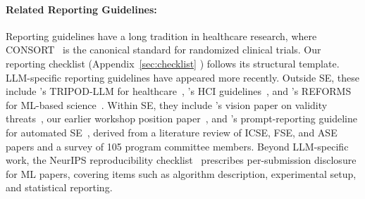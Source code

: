 \documentclass[smallextended]{svjour3}
\newif\ifpaper\papertrue
\newcommand{\scopeparagraph}[1]{\paragraph{\bfseries #1:}}
\newcommand{\scopeparagraph}[1]{\subsubsection{#1}}
\begin{document}
\scopeparagraph{Related Reporting Guidelines}

Reporting guidelines have a long tradition in healthcare research, where CONSORT~\cite{Schulz2010} is the canonical standard for randomized clinical trials. Our reporting checklist (\ifpaper Appendix~\ref{sec:checklist} \else \href{/checklist/}{checklist} \fi) follows its structural template. LLM-specific reporting guidelines have appeared more recently. Outside SE, these include \citeauthor{Gallifant2025}'s TRIPOD-LLM for healthcare~\cite{Gallifant2025}, \citeauthor{DBLP:conf/chi/NavarroSA26}'s HCI guidelines~\cite{DBLP:conf/chi/NavarroSA26}, and \citeauthor{Kapoor2024REFORMS}'s REFORMS for ML-based science~\cite{Kapoor2024REFORMS}. Within SE, they include \citeauthor{DBLP:conf/icse/SallouDP24}'s vision paper on validity threats~\cite{DBLP:conf/icse/SallouDP24}, our earlier workshop position paper~\cite{DBLP:conf/wsese/0001BFB25}, and \citeauthor{DBLP:journals/corr/abs-2601-01954}'s prompt-reporting guideline for automated SE~\cite{DBLP:journals/corr/abs-2601-01954}, derived from a literature review of ICSE, FSE, and ASE papers and a survey of 105 program committee members. Beyond LLM-specific work, the NeurIPS reproducibility checklist~\cite{DBLP:journals/jmlr/PineauVSLBdFL21} prescribes per-submission disclosure for ML papers, covering items such as algorithm description, experimental setup, and statistical reporting.
\end{document}
